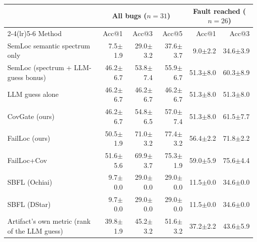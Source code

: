 \begin{tabular}{lrrrrr}
\toprule
 & \multicolumn{3}{c}{All bugs ($n=31$)} & \multicolumn{2}{c}{Fault reached ($n=26$)} \\
\cmidrule(lr){2-4}\cmidrule(lr){5-6}
Method & Acc@1 & Acc@3 & Acc@5 & Acc@1 & Acc@3 \\
\midrule
SemLoc semantic spectrum only & 7.5{\scriptsize$\pm$1.9} & 29.0{\scriptsize$\pm$3.2} & 37.6{\scriptsize$\pm$3.7} & 9.0{\scriptsize$\pm$2.2} & 34.6{\scriptsize$\pm$3.9} \\
SemLoc (spectrum + LLM-guess bonus) & 46.2{\scriptsize$\pm$6.7} & 53.8{\scriptsize$\pm$7.4} & 55.9{\scriptsize$\pm$6.7} & 51.3{\scriptsize$\pm$8.0} & 60.3{\scriptsize$\pm$8.9} \\
LLM guess alone & 46.2{\scriptsize$\pm$6.7} & 46.2{\scriptsize$\pm$6.7} & 46.2{\scriptsize$\pm$6.7} & 51.3{\scriptsize$\pm$8.0} & 51.3{\scriptsize$\pm$8.0} \\
CovGate (ours) & 46.2{\scriptsize$\pm$6.7} & 54.8{\scriptsize$\pm$6.5} & 57.0{\scriptsize$\pm$7.4} & 51.3{\scriptsize$\pm$8.0} & 61.5{\scriptsize$\pm$7.7} \\
FailLoc (ours) & 50.5{\scriptsize$\pm$1.9} & 71.0{\scriptsize$\pm$3.2} & 77.4{\scriptsize$\pm$3.2} & 56.4{\scriptsize$\pm$2.2} & 71.8{\scriptsize$\pm$2.2} \\
FailLoc+Cov & 51.6{\scriptsize$\pm$5.6} & 69.9{\scriptsize$\pm$3.7} & 75.3{\scriptsize$\pm$1.9} & 59.0{\scriptsize$\pm$5.9} & 75.6{\scriptsize$\pm$4.4} \\
SBFL (Ochiai) & 9.7{\scriptsize$\pm$0.0} & 29.0{\scriptsize$\pm$0.0} & 29.0{\scriptsize$\pm$0.0} & 11.5{\scriptsize$\pm$0.0} & 34.6{\scriptsize$\pm$0.0} \\
SBFL (DStar) & 9.7{\scriptsize$\pm$0.0} & 29.0{\scriptsize$\pm$0.0} & 29.0{\scriptsize$\pm$0.0} & 11.5{\scriptsize$\pm$0.0} & 34.6{\scriptsize$\pm$0.0} \\
\midrule
Artifact's own metric (rank of the LLM guess) & 39.8{\scriptsize$\pm$1.9} & 45.2{\scriptsize$\pm$3.2} & 51.6{\scriptsize$\pm$3.2} & 37.2{\scriptsize$\pm$2.2} & 43.6{\scriptsize$\pm$5.9} \\
\bottomrule
\end{tabular}
